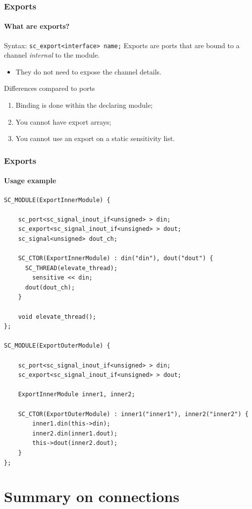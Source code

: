 \begin{frame}[fragile]
\frametitle{Exports}
\framesubtitle{What are exports?}
\begin{block}{Syntax: \texttt{sc\_export<interface> name;}}
Exports are ports that are bound to a channel {\em internal} to the module.
\begin{itemize}
\item They do not need to expose the channel details.
\end{itemize}
\end{block}
\pause
\begin{block}{Differences compared to ports}
\begin{enumerate}
\item Binding is done within the declaring module;
\item You cannot have export arrays;
\item You cannot use an export on a static sensitivity list.
\end{enumerate}
\end{block}

\end{frame}

\begin{frame}[fragile]
\frametitle{Exports}
\framesubtitle{Usage example}
{\tiny 
\begin{verbatim}
SC_MODULE(ExportInnerModule) {

    sc_port<sc_signal_inout_if<unsigned> > din;
    sc_export<sc_signal_inout_if<unsigned> > dout;
    sc_signal<unsigned> dout_ch;

    SC_CTOR(ExportInnerModule) : din("din"), dout("dout") {
      SC_THREAD(elevate_thread);
        sensitive << din;
      dout(dout_ch);
    }
    
    void elevate_thread();
};

SC_MODULE(ExportOuterModule) {

    sc_port<sc_signal_inout_if<unsigned> > din;
    sc_export<sc_signal_inout_if<unsigned> > dout;
    
    ExportInnerModule inner1, inner2;
    
    SC_CTOR(ExportOuterModule) : inner1("inner1"), inner2("inner2") {
        inner1.din(this->din);
        inner2.din(inner1.dout);
        this->dout(inner2.dout);
    }
};
\end{verbatim}
}
\end{frame}

\section{Summary on connections}

